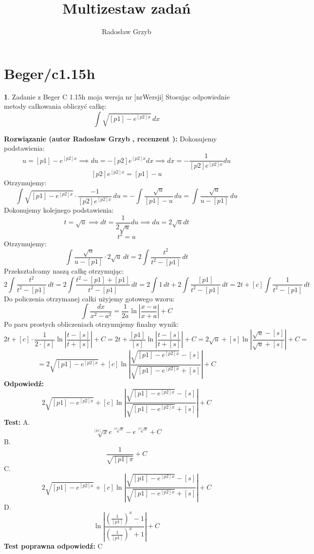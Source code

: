 \documentclass[12pt, a4paper]{article}
\title{Multizestaw zadań}
\author{Radosław Grzyb}
\date{}
\theoremstyle{definition} %
\newtheorem{zad}{}
\newcommand{\kategoria}[1]{\section{#1}} %
\newcommand{\zadStart}[1]{\begin{zad}#1\newline} %
\newcommand{\zadStop}{\end{zad}}   %
\newcommand{\rozwStart}[2]{\noindent \textbf{Rozwiązanie (autor #1 , recenzent #2): }\newline} %
\newcommand{\rozwStop}{\newline}                                            %
\newcommand{\odpStart}{\noindent \textbf{Odpowiedź:}\newline}    %
\newcommand{\odpStop}{\newline}                                             %
\newcommand{\testStart}{\noindent \textbf{Test:}\newline} %
\newcommand{\testStop}{\newline} %
\newcommand{\kluczStart}{\noindent \textbf{Test poprawna odpowiedź:}\newline} %
\newcommand{\kluczStop}{\newline} %
\begin{document}
\maketitle
\kategoria{Beger/c1.15h}
\zadStart{Zadanie z Beger C 1.15h moja wersja nr [nrWersji]}
Stosując odpowiednie metody całkowania obliczyć całkę:
$$\int \sqrt{[p1]-e^{[p2]x}}\,dx$$
\zadStop
\rozwStart{Radosław Grzyb}{}
Dokonujemy podstawienia:
$$u=[p1]-e^{[p2]x} \implies du=-[p2]e^{[p2]x} dx\implies dx=-\frac{1}{[p2]e^{[p2]x}}du$$
$$[p2]e^{[p2]x}=[p1]-u$$
Otrzymujemy:
$$\int \sqrt{[p1]-e^{[p2]x}}\cdot\frac{-1}{[p2]e^{[p2]x}}\,du=-\int \frac{\sqrt{u}}{[p1]-u}\,du=\int \frac{\sqrt{u}}{u-[p1]}\,du$$
Dokonujemy kolejnego podstawienia:
$$t=\sqrt{u} \implies dt=\frac{1}{2\sqrt{u}}du\implies du=2\sqrt{u}dt$$
$$t^2=u$$
Otrzymujemy:
$$\int \frac{\sqrt{u}}{u-[p1]}\cdot2\sqrt{u}\,dt=2\int \frac{t^2}{t^2-[p1]}\,dt$$
Przekształcamy naszą całkę otrzymując:
$$2\int \frac{t^2}{t^2-[p1]}\,dt=2\int\frac{t^2-[p1]+[p1]}{t^2-[p1]}\,dt=2\int1\,dt+2\int\frac{[p1]}{t^2-[p1]}\,dt=2t+[c]\int\frac{1}{t^2-[p1]}\,dt$$
Do policzenia otrzymanej całki użyjemy gotowego wzoru: $$\int\frac{dx}{x^2-a^2}=\frac{1}{2a}\ln\left|\frac{x-a}{x+a}\right|+C$$
Po paru prostych obliczeniach otrzymujemy finalny wynik:
$$2t+[c]\cdot\frac{1}{2\cdot[s]}\ln\left|\frac{t-[s]}{t+[s]}\right|+C=2t+\frac{[p1]}{[s]}\ln\left|\frac{t-[s]}{t+[s]}\right|+C=2\sqrt{u}+[s]\ln\left|\frac{\sqrt{u}-[s]}{\sqrt{u}+[s]}\right|+C=$$$$=2\sqrt{[p1]-e^{[p2]x}}+[c]\ln\left|\frac{\sqrt{[p1]-e^{[p2]x}}-[s]}{\sqrt{[p1]-e^{[p2]x}}+[s]}\right|+C$$
\rozwStop
\odpStart
$$2\sqrt{[p1]-e^{[p2]x}}+[c]\ln\left|\frac{\sqrt{[p1]-e^{[p2]x}}-[s]}{\sqrt{[p1]-e^{[p2]x}}+[s]}\right|+C$$
\odpStop
\testStart
A.$$\sqrt[[p1]]{x}e^{\sqrt[[p1]]{x}}-e^{\sqrt[[p1]]{x}}+C$$
B.$$\frac{1}{\sqrt{[p1]\pi}}+C$$
C.$$2\sqrt{[p1]-e^{[p2]x}}+[c]\ln\left|\frac{\sqrt{[p1]-e^{[p2]x}}-[s]}{\sqrt{[p1]-e^{[p2]x}}+[s]}\right|+C$$
D.$$\ln\left|\frac{\left(\frac{1}{[p1]}\right)^x-1}{\left(\frac{1}{[p1]}\right)^x+1}\right|+C$$
\testStop
\kluczStart
C
\kluczStop
\end{document}
